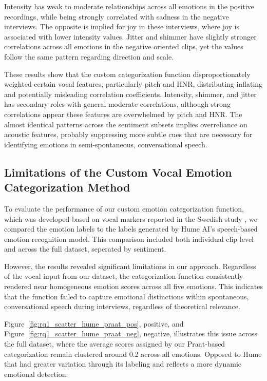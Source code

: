 Intensity has weak to moderate relationships across all emotions in the positive recordings, while being strongly correlated with sadness in the negative interviews. The opposite is implied for joy in these interviews, where joy is associated with lower intensity values. 
Jitter and shimmer have slightly stronger correlations across all emotions in the negative oriented clips, yet the values follow the same pattern regarding direction and scale. 

\medskip
These results show that the custom categorization function disproportionately weighted certain vocal features, particularly pitch and HNR, distributing inflating and potentially misleading correlation coefficients. Intensity, shimmer, and jitter has secondary roles with general moderate correlations, although strong correlations appear these features are overwhelmed by pitch and HNR. The almost identical patterns across the sentiment subsets implies overreliance on acoustic features, probably suppressing more subtle cues that are necessary for identifying emotions in semi-spontaneous, conversational speech. 


\subsection{Limitations of the Custom Vocal Emotion Categorization Method}
To evaluate the performance of our custom emotion categorization function, which was developed based on vocal markers reported in the Swedish study \autocite{Ekberg2023}, we compared the emotion labels to the labels generated by Hume AI’s speech-based emotion recognition model. This comparison included both individual clip level and across the full dataset, seperated by sentiment. 

However, the results revealed significant limitations in our approach. Regardless of the vocal input from our dataset, the categorization function consistently rendered near homogeneous emotion scores across all five emotions. This indicates that the function failed to capture emotional distinctions within spontaneous, conversational speech during interviews, regardless of theoretical relevance. 

Figure~\ref{fig:rq1_scatter_hume_praat_pos}, positive, and Figure~\ref{fig:rq1_scatter_hume_praat_neg}, negative, illustrates this issue across the full dataset, where the average scores assigned by our Praat-based categorization remain clustered around 0.2 across all emotions. Opposed to Hume that had greater variation through its labeling and reflects a more dynamic emotional detection.

